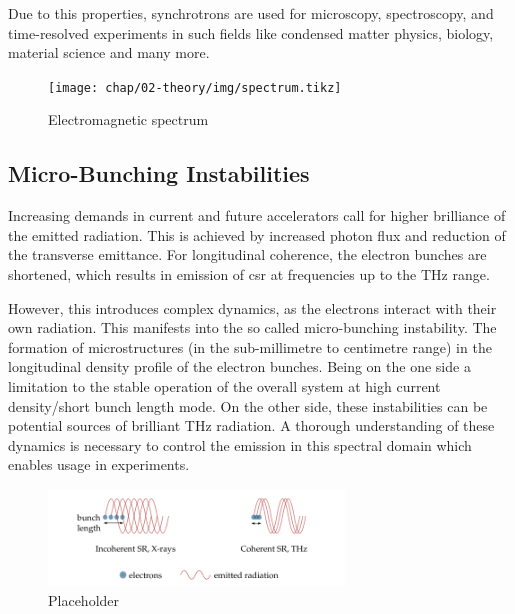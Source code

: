 Due to this properties, synchrotrons are used for microscopy, spectroscopy, and time-resolved experiments in such fields like condensed matter physics, biology, material science and many more.
\begin{figure}[H]
	\centering
	\texttt{[image: chap/02-theory/img/spectrum.tikz]}
	\caption{Electromagnetic spectrum} %
	\label{fig:spectrum}
\end{figure}

\subsection{Micro-Bunching Instabilities}
Increasing demands in current and future accelerators call for higher brilliance of the emitted radiation.
This is achieved by increased photon flux and reduction of the transverse emittance.
For longitudinal coherence, the electron bunches are shortened, which results in emission of \gls{csr} at frequencies up to the THz range.

However, this introduces complex dynamics, as the electrons interact with their own radiation.
This manifests into the so called micro-bunching instability.
The formation of microstructures (in the sub-millimetre to centimetre range) in the longitudinal density profile of the electron bunches. %
Being on the one side a limitation to the stable operation of the overall system at high current density/short bunch length mode.
On the other side, these instabilities can be potential sources of brilliant THz radiation. %
A thorough understanding of these dynamics is necessary to control the emission in this spectral domain which enables usage in experiments. \cite{rota2018,brosi}

\begin{figure}[tbh]
	\centering
	\includegraphics[width = 0.7\textwidth]{chap/02-theory/img/csr2.png}
	\caption{Placeholder \cite{rota2018}}
	\label{fig:csr}
\end{figure}

